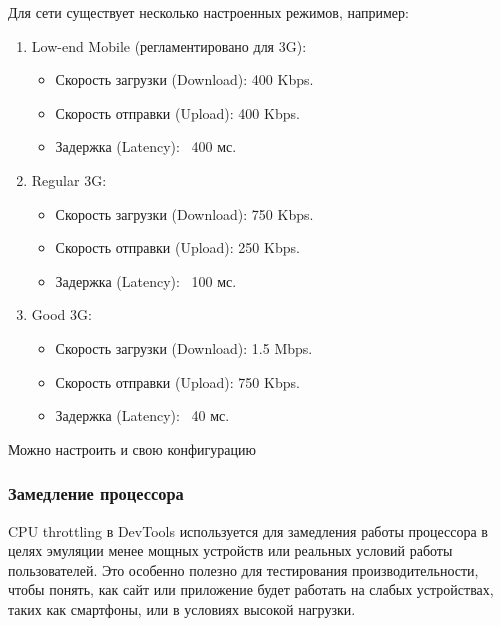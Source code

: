 \documentclass[12pt]{article}
\begin{document}
Для сети существует несколько настроенных режимов, например:

\begin{enumerate}
    \item Low-end Mobile (регламентировано для 3G):

          \begin{itemize}[label=-]
              \item Скорость загрузки (Download): 400 Kbps.
              \item Скорость отправки (Upload): 400 Kbps.
              \item Задержка (Latency): ~400 мс.

          \end{itemize}
    \item Regular 3G:

          \begin{itemize}[label=-]
              \item Скорость загрузки (Download): 750 Kbps.
              \item Скорость отправки (Upload): 250 Kbps.
              \item Задержка (Latency): ~100 мс.

          \end{itemize}

    \item Good 3G:
          \begin{itemize}[label=-]
              \item Скорость загрузки (Download): 1.5 Mbps.
              \item Скорость отправки (Upload): 750 Kbps.
              \item Задержка (Latency): ~40 мс.
          \end{itemize}
\end{enumerate}

Можно настроить и свою конфигурацию

\subsubsection{Замедление процессора}

CPU throttling в DevTools используется для замедления работы процессора
в целях эмуляции менее мощных устройств или реальных условий работы пользователей.
Это особенно полезно для тестирования производительности, чтобы понять,
как сайт или приложение будет работать на слабых устройствах,
таких как смартфоны, или в условиях высокой нагрузки.
\end{document}
